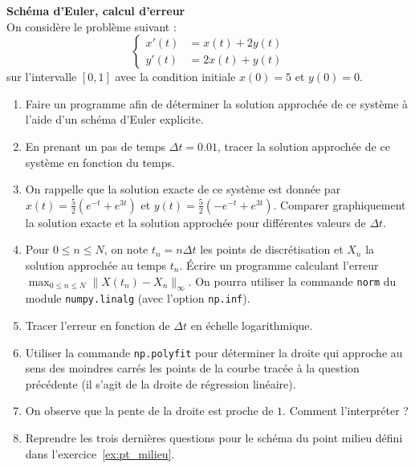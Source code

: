 \documentclass[12pt]{article}
\begin{document}
\begin{exo}
  \label{ex:sch_exp}
  \textbf{Sch\'ema d'Euler, calcul d'erreur} \\
On consid\`ere le probl\`eme suivant :
$$
\left\{
\begin{array}{rl}
x'(t)&=x(t)+2y(t)\\
y'(t)&=2x(t)+y(t)
\end{array}
\right.
$$
sur l'intervalle $[0,1]$ avec la condition initiale $x(0)=5$ et $y(0)=0$.
\begin{enumerate}
\item Faire un programme afin de d\'eterminer la solution approch\'ee de ce syst\`eme \`a l'aide d'un sch\'ema d'Euler explicite. 
\item En prenant un pas de temps $\Delta t = 0.01$, tracer la solution approch\'ee de ce syst\`eme en fonction du temps.
\item On rappelle que la solution exacte de ce syst\`eme est donn\'ee par
  $x(t) = \frac52 (e^{-t} + e^{3t})$ et $y(t) = \frac52 (-e^{-t} + e^{3t})$. Comparer graphiquement la solution exacte et la solution approch\'ee pour diff\'erentes valeurs de $\Delta t$.
\item Pour $0\leq n \leq N$, on note $t_n=n\Delta t$ les points de discr\'etisation et $X_n$ la solution approch\'ee au temps $t_n$. \'Ecrire un programme
  calculant l'erreur $\max_{0\leq n \leq N}\|X(t_n)-X_n\|_{\infty}$. On pourra utiliser la commande \texttt{norm} du module \texttt{numpy.linalg} (avec l'option \texttt{np.inf}). 
\item Tracer  l'erreur en fonction de $\Delta t$ en \'echelle logarithmique. 
\item Utiliser la commande \texttt{np.polyfit} pour d\'eterminer la droite qui approche au sens des moindres carr\'es les points de la courbe tracée à la question précédente
  (il s'agit de la droite de r\'egression lin\'eaire).
\item On observe que la pente de la droite est proche de $1$. Comment l'interpr\'eter ?
\item Reprendre les trois derni\`eres questions
  pour le sch\'ema du point milieu d\'efini dans l'exercice~\ref{ex:pt_milieu}.
\end{enumerate}
\end{exo}
\newpage
\end{document}
